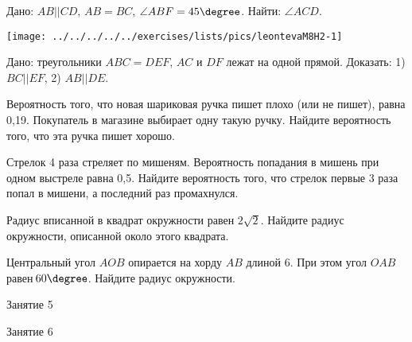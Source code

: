 \begin{homework}[number=2]
	\begin{listofex}
		\item 
		\begin{minipage}[t]{\bodywidth}
			Дано: \( AB || CD \), \( AB = BC \), \( \angle ABF = 45\degree \). Найти: \( \angle ACD \).
		\end{minipage}
		\hspace{0.02\linewidth}
		\begin{minipage}[t]{\picwidth}
			\texttt{[image: ../../../../../exercises/lists/pics/leontevaM8H2-1]}
		\end{minipage}
		\item Дано: треугольники \( ABC = DEF \), \( AC \) и \( DF \) лежат на одной прямой. Доказать: 1) \( BC || EF \), 2) \( AB || DE \).
		\item Вероятность того, что новая шариковая ручка пишет плохо (или не пишет), равна 0,19. Покупатель в магазине выбирает одну такую ручку. Найдите вероятность того, что эта ручка пишет хорошо.
		\item Стрелок 4 раза стреляет по мишеням. Вероятность попадания в мишень при одном выстреле равна 0,5. Найдите вероятность того, что стрелок первые 3 раза попал в мишени, а последний раз промахнулся.
		\item  Радиус вписанной в квадрат окружности равен \( 2\sqrt{2}  \). Найдите радиус окружности, описанной около этого квадрата.
		\item Центральный угол \( AOB \) опирается на хорду \( AB \) длиной 6. При этом угол \( OAB \) равен \( 60\degree \). Найдите радиус окружности.
	\end{listofex}
\end{homework}

\begin{class}[number=5]
	\begin{listofex}
		\item Занятие 5
	\end{listofex}
\end{class}

\begin{class}[number=6]
	\begin{listofex}
		\item Занятие 6
	\end{listofex}
\end{class}

